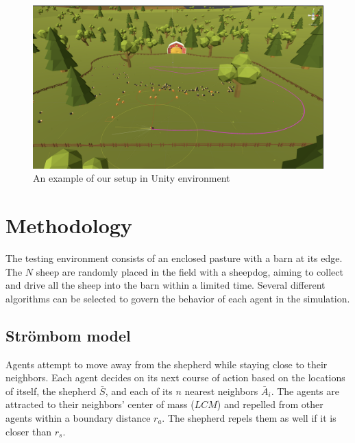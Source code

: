\documentclass[9pt]{pnas-new}
\begin{document}
\begin{figure}[H]
    \centering
    \includegraphics[width=0.7\columnwidth]{fig/strombom2.png}
    \caption{An example of our setup in Unity environment}
\end{figure}

\section*{Methodology}
The testing environment consists of an enclosed pasture with a barn at its edge. The $N$ sheep are randomly placed in the field with a sheepdog, aiming to collect and drive all the sheep into the barn within a limited time. Several different algorithms can be selected to govern the behavior of each agent in the simulation.

\subsection{Str\"{o}mbom model}
Agents attempt to move away from the shepherd while staying close to their neighbors. Each agent decides on its next course of action based on the locations of itself, the shepherd $\bar{S}$, and each of its $n$ nearest neighbors $\bar{A}_{i}$. The agents are attracted to their neighbors' center of mass ($LCM$) and repelled from other agents within a boundary distance $r_a$. The shepherd repels them as well if it is closer than $r_s$.
\end{document}
